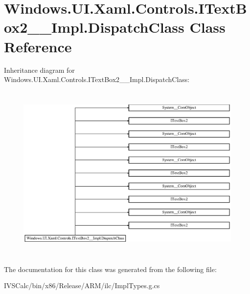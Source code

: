 \hypertarget{class_windows_1_1_u_i_1_1_xaml_1_1_controls_1_1_i_text_box2_____impl_1_1_dispatch_class}{}\section{Windows.\+U\+I.\+Xaml.\+Controls.\+I\+Text\+Box2\+\_\+\+\_\+\+Impl.\+Dispatch\+Class Class Reference}
\label{class_windows_1_1_u_i_1_1_xaml_1_1_controls_1_1_i_text_box2_____impl_1_1_dispatch_class}
Inheritance diagram for Windows.\+U\+I.\+Xaml.\+Controls.\+I\+Text\+Box2\+\_\+\+\_\+\+Impl.\+Dispatch\+Class\+:\begin{figure}[H]
\begin{center}
\leavevmode
\includegraphics[height=8.901734cm]{class_windows_1_1_u_i_1_1_xaml_1_1_controls_1_1_i_text_box2_____impl_1_1_dispatch_class}
\end{center}
\end{figure}


The documentation for this class was generated from the following file\+:\begin{DoxyCompactItemize}
\item 
I\+V\+S\+Calc/bin/x86/\+Release/\+A\+R\+M/ilc/Impl\+Types.\+g.\+cs\end{DoxyCompactItemize}
